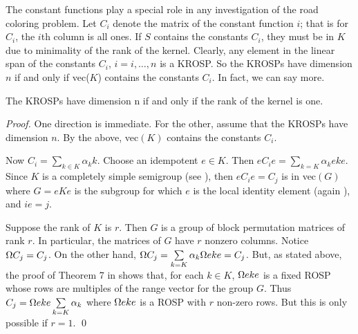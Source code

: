 The constant functions play a special role in any investigation of the road coloring problem. 
Let $C_i$ denote the matrix of the constant function $i$; that is for $C_i$, the $i$th  column is all ones.  
If $S$ contains the constants  $C_i$, they must be in $K$ due to minimality of the rank of the kernel.
Clearly, any element in the linear span of the constants  $C_i$, $i = i,\ldots,n$ is a KROSP.   
So the KROSPs have dimension $n$ if and only if vec($K$) contains the constants  $C_i$.  
In fact, we can say more.


\begin{proposition}  	\label{prop:5.3}
The KROSPs have dimension n if and only if the rank of the kernel is one.
\end{proposition}


\begin{proof}
One direction is immediate.  
For the other, assume that the KROSPs have dimension $n$. 
By the above, vec$(K)$ contains the constants $C_i$.


Now  $C_i = \sum\limits_{k \in K} \alpha_k k$.
Choose an idempotent $e \in K$.  
Then $eC_i e = \sum\limits_{k=K} \alpha_k eke$.  
Since $K$ is a completely simple semigroup (see \cite{CP}), then $eC_i e= C_j$  is in vec$(G)$ where $G = eKe$ is the subgroup for which $e$ is the local identity element (again \cite{CP}), and $ie=j$.


Suppose the rank of $K$ is $r$.  
Then $G$ is a group of block permutation matrices of rank $r$.  
In particular, the matrices of $G$ have $r$ nonzero columns.  
Notice $\Omega C_j = C_j$.
On the other hand, $\Omega C_j = \sum\limits_{k=K} \alpha_k \Omega eke = C_j$.
But, as stated above, the proof of Theorem 7 in \cite{BM} shows that, for each $k \in K$, 
$\Omega eke$ is a fixed ROSP whose rows are multiples of the range vector for the group $G$.  
Thus $C_j = \Omega eke \sum\limits_{k=K} \alpha_k$ where $\Omega eke$ is a ROSP with $r$ non-zero rows.  
But this is only possible if $r =1$. 
\qed
\end{proof}
